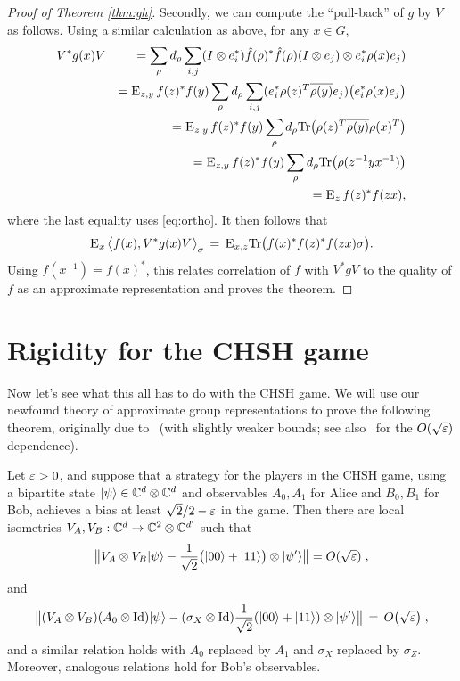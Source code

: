 \begin{proof}[Proof of Theorem \ref{thm:gh}]
Secondly, we can compute the ``pull-back'' of $g$ by $V$ as follows. Using a similar calculation as above, for any $x\in G$, 
\begin{eqnarray*}
& V^*g(x) V  &=  \sum_{\rho}  d_\rho \sum_{i,j} (I\otimes e_i^*)\hat{f}(\rho)^* \hat{f}(\rho)(I\otimes e_j) \otimes e_i^* \rho(x) e_j ) \\
&& =  \textsc{E}_{z,y}\,  f(z)^*f(y)  \sum_{\rho}  d_\rho \sum_{i,j} (e_i^* \rho(z)^T \overline{\rho(y)} e_j) \big( e_i^* \rho(x) e_j \big) \\
&& =  \textsc{E}_{z,y}\,  f(z)^*f(y)  \sum_{\rho}  d_\rho \mathrm{Tr}\big( \rho(z)^T \overline{\rho(y)}  {\rho(x)^T} \big) \\
&& =  \textsc{E}_{z,y}\,  f(z)^*f(y)  \sum_{\rho}  d_\rho \mathrm{Tr}\big( \rho(z^{-1}y x^{-1}) \big) \\
&& =  \textsc{E}_{z}\,  f(z)^*f(zx) , 
\end{eqnarray*}
where the last equality uses \eqref{eq:ortho}.
It then follows that 
\begin{eqnarray*}
\textsc{E}_{x}\, \big\langle f(x), V^*g(x) V \big\rangle_\sigma \,=\,  \textsc{E}_{x,z} \mathrm{Tr}\big( f(x)^* f(z)^* f(zx)\sigma\big).
\end{eqnarray*}  
Using $f(x^{-1})=f(x)^*$, this relates correlation of $f$ with $V^*gV$ to the quality of $f$ as an approximate representation and proves the theorem. 
\end{proof}

\section{Rigidity for the CHSH game}

Now let's see what this all has to do with the CHSH game. We will use our newfound theory of approximate group representations to prove the following theorem, originally due to~\cite{summers1988maximal} (with slightly weaker bounds; see also~\cite{mckague2012robust} for the $O(\sqrt{\varepsilon})$ dependence).

\begin{theorem}\label{thm:rigid-chsh}
Let $\varepsilon>0$, and suppose that a strategy for the players  in the CHSH game, using  a bipartite state $|\psi\rangle\in\mathbb{C}^d\otimes \mathbb{C}^d$ and observables $A_0,A_1$ for Alice and $B_0,B_1$ for Bob, achieves a bias at least $\sqrt{2}/2-\varepsilon$ in the game. Then there are local isometries $V_A,V_B:\mathbb{C}^d \to \mathbb{C}^2 \otimes \mathbb{C}^{d'}$ such that 
\begin{equation}\label{eq:chsh-state}
\big\| V_A \otimes V_B |\psi\rangle - \frac{1}{\sqrt{2}}\big(|00\rangle+|11\rangle\big) \otimes |\psi'\rangle \big\| = O(\sqrt{\varepsilon}) \;,
\end{equation}
and 
\begin{equation}\label{eq:chsh-alice}
\big\|( V_A \otimes V_B)( A_0 \otimes \mathop{\rm Id}\nolimits )|\psi\rangle - (\sigma_X \otimes \mathop{\rm Id}\nolimits)\frac{1}{\sqrt{2}}(|00\rangle+|11\rangle) \otimes |\psi'\rangle \big\|\,=\, O\big(\sqrt{\varepsilon}\big)\;,
\end{equation}
and a similar relation holds with $A_0$ replaced by $A_1$ and $\sigma_X$ replaced by $\sigma_Z$. Moreover, analogous relations hold for Bob's observables. 
\end{theorem}

